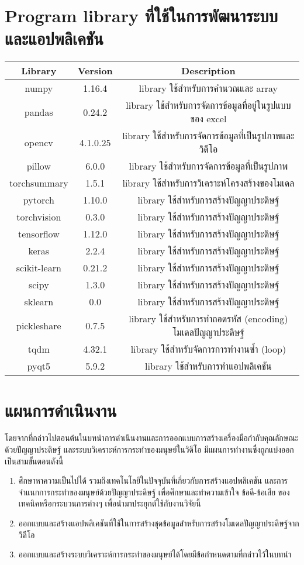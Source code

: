 \section{Program library ที่ใช้ในการพัฒนาระบบและแอปพลิเคชัน} 
\begin{tabular}{|c|c|c|}
		\hline
		{Library}&{Version}&{Description}\\
		\hline
		numpy	 			& 1.16.4		& library ใช้สำหรับการคำนวณและ array			\\
		pandas				& 0.24.2		& library ใช้สำหรับการจัดการข้อมูลที่อยู่ในรูปแบบของ excel				\\
		opencv			 	& 4.1.0.25		& library ใช้สำหรับการจัดการข้อมูลที่เป็นรูปภาพและวิดีโอ		\\
		pillow				& 6.0.0			& library ใช้สำหรับการจัดการข้อมูลที่เป็นรูปภาพ			\\
		torchsummary		& 1.5.1			& library ใช้สำหรับการวิเคราะห์โครงสร้างของโมเดล 							\\
		pytorch		 		& 1.10.0		& library ใช้สำหรับการสร้างปัญญาประดิษฐ์							\\
		torchvision			& 0.3.0	 		& library ใช้สำหรับการสร้างปัญญาประดิษฐ์							\\
		tensorflow			& 1.12.0			& library ใช้สำหรับการสร้างปัญญาประดิษฐ์							\\
		keras				& 2.2.4			& library ใช้สำหรับการสร้างปัญญาประดิษฐ์							\\
		scikit-learn		& 0.21.2		& library ใช้สำหรับการสร้างปัญญาประดิษฐ์							\\
		scipy				& 1.3.0			& library ใช้สำหรับการสร้างปัญญาประดิษฐ์							\\
		sklearn				& 0.0			& library ใช้สำหรับการสร้างปัญญาประดิษฐ์							\\
		pickleshare			& 0.7.5			& library ใช้สำหรับการทำถอดรหัส (encoding) โมเดลปัญญาประดิษฐ์			\\
		tqdm				& 4.32.1		& library ใช้สำหรับจัดการการทำงานซ้ำ (loop)					\\
		pyqt5				& 5.9.2			& library ใช้สำหรับการทำแอปพลิเคชัน					\\
		\hline
\end{tabular}

\vspace{3mm}
\section{แผนการดำเนินงาน}
โดยจากที่กล่าวไปตอนต้นในบทนำการดำเนินงานและการออกแบบการสร้างเครื่องมือกำกับคุณลักษณะด้วยปัญญาประดิษฐ์
และระบบวิเคราะห์การกระทำของมนุษย์ในวิดีโอ มีแผนการทำงานซึ่งถูกแบ่งออกเป็นสามขั้นตอนดังนี้
\begin{enumerate}
	\setlength\itemsep{-0.25em}
	\item ศึกษาหาความเป็นไปได้ รวมถึงเทคโนโลยีในปัจจุบันที่เกี่ยวกับการสร้างแอปพลิเคชัน และการจำแนกการกระทำของมนุษย์ด้วยปัญญาประดิษฐ์ 
	เพื่อศึกษาและทำความเข้าใจ ข้อดี-ข้อเสีย ของเทคนิคหรือกระบวนการต่างๆ เพื่อนำมาประยุกต์ใช้กับงานวิจัยนี้
	\item ออกแบบและสร้างแอปพลิเคชันที่ใช้ในการสร้างชุดข้อมูลสำหรับการสร้างโมเดลปัญญาประดิษฐ์จากวิดีโอ
	\item ออกแบบและสร้างระบบวิเคราะห์การกระทำของมนุษย์ได้โดยมีข้อกำหนดตามที่กล่าวไว้ในบทนำ
\end{enumerate}
\clearpage

